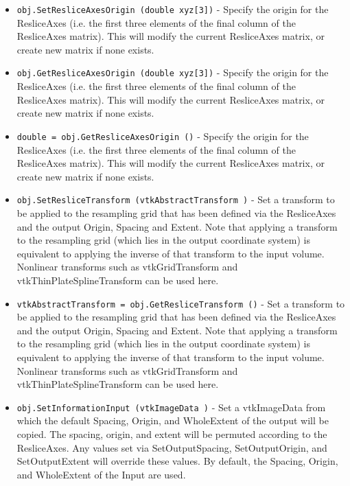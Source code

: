 \begin{itemize}
\item  \verb|obj.SetResliceAxesOrigin (double xyz[3])| -  Specify the origin for the ResliceAxes (i.e. the first three
 elements of the final column of the ResliceAxes matrix).
 This will modify the current ResliceAxes matrix, or create
 new matrix if none exists.

\item  \verb|obj.GetResliceAxesOrigin (double xyz[3])| -  Specify the origin for the ResliceAxes (i.e. the first three
 elements of the final column of the ResliceAxes matrix).
 This will modify the current ResliceAxes matrix, or create
 new matrix if none exists.

\item  \verb|double = obj.GetResliceAxesOrigin ()| -  Specify the origin for the ResliceAxes (i.e. the first three
 elements of the final column of the ResliceAxes matrix).
 This will modify the current ResliceAxes matrix, or create
 new matrix if none exists.

\item  \verb|obj.SetResliceTransform (vtkAbstractTransform )| -  Set a transform to be applied to the resampling grid that has
 been defined via the ResliceAxes and the output Origin, Spacing
 and Extent.  Note that applying a transform to the resampling
 grid (which lies in the output coordinate system) is
 equivalent to applying the inverse of that transform to
 the input volume.  Nonlinear transforms such as vtkGridTransform
 and vtkThinPlateSplineTransform can be used here.

\item  \verb|vtkAbstractTransform = obj.GetResliceTransform ()| -  Set a transform to be applied to the resampling grid that has
 been defined via the ResliceAxes and the output Origin, Spacing
 and Extent.  Note that applying a transform to the resampling
 grid (which lies in the output coordinate system) is
 equivalent to applying the inverse of that transform to
 the input volume.  Nonlinear transforms such as vtkGridTransform
 and vtkThinPlateSplineTransform can be used here.

\item  \verb|obj.SetInformationInput (vtkImageData )| -  Set a vtkImageData from which the default Spacing, Origin,
 and WholeExtent of the output will be copied.  The spacing,
 origin, and extent will be permuted according to the 
 ResliceAxes.  Any values set via SetOutputSpacing, 
 SetOutputOrigin, and SetOutputExtent will override these
 values.  By default, the Spacing, Origin, and WholeExtent
 of the Input are used.


\end{itemize}
